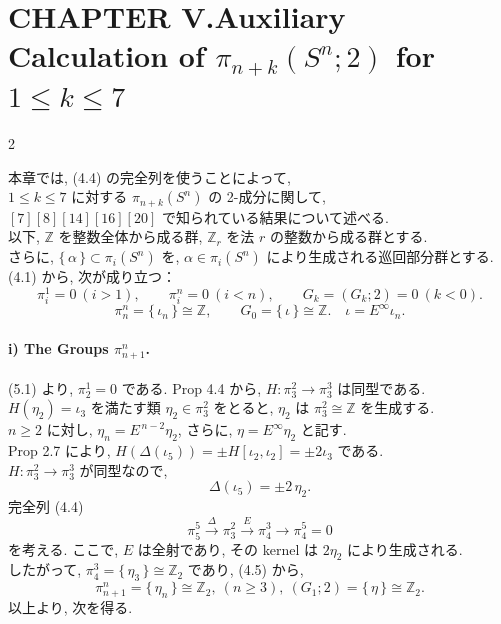 \documentclass[10pt, leqno]{ltjsarticle}
\author{}
\date{}
\newcommand{\gen}[1]{\{\,#1\,\}}       %
\numberwithin{equation}{section}
\theoremstyle{plain}
\theoremstyle{definition}
\theoremstyle{remark}
\begin{document}
\setcounter{section}{5}

\section*{CHAPTER V.\quad Auxiliary Calculation of \(\pi_{n+k}(S^n;2)\) for \(1\le k\le 7\)}

\begin{paracol}{2}


本章では, (4.4) の完全列を使うことによって, \\
\(1\le k\le 7\) に対する \(\pi_{n+k}(S^n)\) の 2-成分に関して,\\
\([7][8][14][16][20]\) で知られている結果について述べる. \\
以下, \(\mathbb Z\) を整数全体から成る群, 
\(\mathbb Z_r\) を法 \(r\) の整数から成る群とする. \\
さらに, \(\gen{\alpha}\subset \pi_i(S^n)\) を, 
\(\alpha\in \pi_i(S^n)\) により生成される巡回部分群とする. \\
(4.1) から, 次が成り立つ：
\begin{equation}\label{5.1}
\pi^{1}_{i}=0\ (i>1),\qquad
\pi^{n}_{i}=0\ (i<n),\qquad
G_k=(G_k;2)=0\ (k<0).
\end{equation}
\[
\pi^{n}_{n}=\gen{\iota_n}\cong \mathbb Z,\qquad
G_0=\gen{\iota}\cong \mathbb Z. \quad 
\iota=E^{\infty}\iota_n.
\]

\paragraph*{i) The Groups \(\pi^{n}_{n+1}\).}
(5.1) より, \(\pi^{1}_{2}=0\) である. Prop 4.4 から,
\(
H:\pi^{2}_{3}\longrightarrow \pi^{3}_{3}
\)
は同型である. \\
\(H(\eta_2)=\iota_3\) を満たす類 \(\eta_2\in \pi^{2}_{3}\) をとると, 
\(\eta_2\) は \(\pi^{2}_{3}\cong\mathbb Z\) を生成する. \\
\(n\ge2\) に対し, \(\eta_n=E^{\,n-2}\eta_2\), 
さらに, \(\eta=E^{\infty}\eta_2\) と記す. \\
Prop 2.7 により,
\(H(\Delta(\iota_5))=\pm H[\iota_2,\iota_2]=\pm 2\iota_3\) である. \\
\(H:\pi^{2}_{3}\to\pi^{3}_{3}\) が同型なので, 
\[
\Delta(\iota_5)=\pm 2\,\eta_2 .
\]
完全列 (4.4)
\[
\pi^{5}_{5}\xrightarrow{\ \Delta\ }\pi^{2}_{3}\xrightarrow{\ E\ }\pi^{3}_{4}\xrightarrow{\ \ }\pi_{4}^{5}=0
\]
を考える. ここで, \(E\) は全射であり, 
その kernel は \(2\eta_2\) により生成される. \\
したがって,
\(\pi^{3}_{4}=\gen{\eta_3}\cong\mathbb Z_2\) であり, (4.5) から,
\[
\pi^{n}_{n+1}=\gen{\eta_n}\cong\mathbb Z_2, \ (n\ge3), \
(G_1;2)=\gen{\eta}\cong\mathbb Z_2.
\]
以上より, 次を得る. 


\end{paracol}
\end{document}
